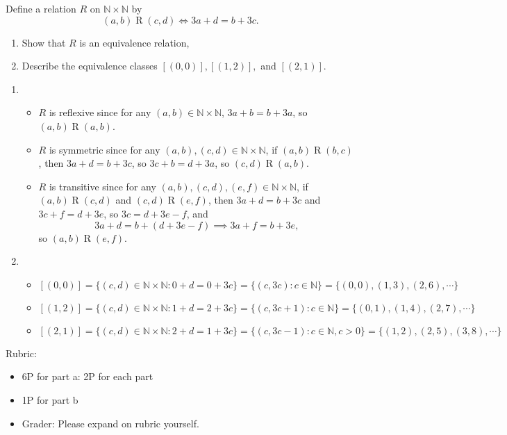 \documentclass{article}
\theoremstyle{definition}
\begin{document}
\begin{question}{7}
    Define a relation $R$ on $\mathbb{N}\times \mathbb{N}$ by
	\[
	(a, b)\mathrel{R}(c, d) \iff 3a+d = b+3c.
	\]
	\begin{enumerate}
	\item Show that $R$ is an equivalence relation, 
	\item Describe the equivalence classes $[(0, 0)], [(1, 2)],$ and $[(2, 1)]$.
	\end{enumerate}
\end{question}
\begin{solution}
	\begin{enumerate}
	\item 
	\begin{itemize} 
		\item $ R$ is reflexive since for any $(a, b) \in \mathbb{N}\times \mathbb{N}$, $3a+b = b+3a$, so $(a, b)\mathrel{R}(a, b)$.
		\item $ R$ is symmetric since for any $(a,b), (c, d) \in \mathbb{N}\times \mathbb{N}$, if $(a, b) \mathrel{R}(b, c)$, then $3a+d = b+3c$, so $3c+b = d+3a$, so $(c, d) \mathrel{R} (a, b)$.
		\item $R$ is transitive since for any $(a,b), (c, d), (e, f) \in \mathbb{N}\times \mathbb{N}$, if $(a, b) \mathrel{R}(c, d)$ and $(c, d) \mathrel{R}(e, f)$, then $3a+d = b+3c$ and $3c+f = d +3e$, so $3c = d+3e-f$, and 
		\[
		3a + d = b + (d + 3e -f)
		\implies 3a+f = b+ 3e,
		\]
		so $(a,b) \mathrel{R}(e, f)$.
	\end{itemize}
	\item \begin{itemize}
	\item $[(0, 0)] = \{(c, d) \in \mathbb{N}\times \mathbb{N}: 0+d = 0+ 3c\} = \{ (c, 3c): c\in \mathbb{N}\} = \{(0, 0), (1, 3), (2, 6), \cdots\}$
	\item $[(1, 2)]= \{(c, d) \in \mathbb{N}\times \mathbb{N}: 1+d = 2+ 3c\} = \{ (c, 3c+1): c\in \mathbb{N}\} = \{(0, 1), (1, 4), (2, 7), \cdots\}$
	\item $[(2, 1)] = \{(c, d) \in \mathbb{N}\times \mathbb{N}: 2+d = 1+ 3c\} = \{ (c, 3c-1): c\in \mathbb{N}, c>0\} = \{(1, 2), (2, 5), (3, 8), \cdots\}$
	\end{itemize}
	\end{enumerate}
{\color{red} Rubric:
\begin{itemize}
\item 6P for part a: 2P for each part
\item 1P for part b
\item Grader: Please expand on rubric yourself.
\end{itemize}}
\end{solution}
\end{document}
